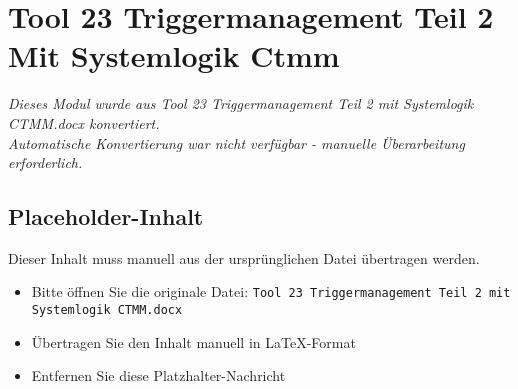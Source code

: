 
\section{Tool 23 Triggermanagement Teil 2 Mit Systemlogik Ctmm}
\label{sec:tool-23-triggermanagement-teil-2-mit-systemlogik-ctmm}

\begin{center}
\textit{Dieses Modul wurde aus Tool 23 Triggermanagement Teil 2 mit Systemlogik CTMM.docx konvertiert.\\
Automatische Konvertierung war nicht verfügbar - manuelle Überarbeitung erforderlich.}
\end{center}


\subsection{Placeholder-Inhalt}

Dieser Inhalt muss manuell aus der ursprünglichen Datei übertragen werden.

\begin{itemize}
\item Bitte öffnen Sie die originale Datei: \texttt{Tool 23 Triggermanagement Teil 2 mit Systemlogik CTMM.docx}
\item Übertragen Sie den Inhalt manuell in LaTeX-Format
\item Entfernen Sie diese Platzhalter-Nachricht
\end{itemize}
